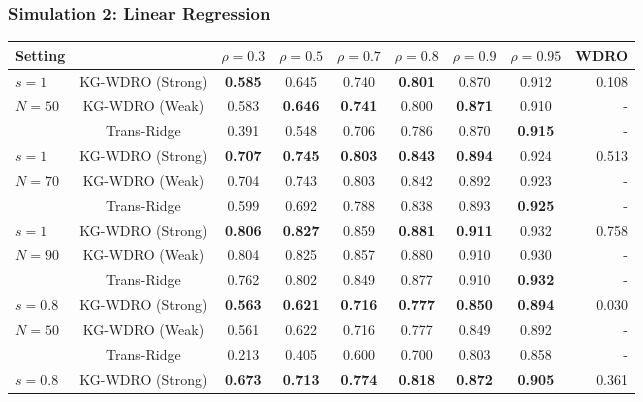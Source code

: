 \documentclass[12pt]{article}
\begin{document}
\subsubsection{Simulation 2: Linear Regression}
\begin{table}[H]
\begin{center}
\setlength{\tabcolsep}{4pt} %
\renewcommand{\arraystretch}{1.1} %
\begin{small}
\begin{sc}
\begin{tabular}{l|c|cccccc|r}
\toprule
Setting & & $\rho = 0.3$ & $\rho = 0.5$ & $\rho = 0.7$ & $\rho = 0.8$ & $\rho = 0.9$ & $\rho = 0.95$ & WDRO\\
\midrule
$s = 1$ & KG-WDRO (Strong) & \textbf{0.585} & 0.645 & 0.740 & \textbf{0.801} & 0.870 & 0.912 & 0.108\\
$N=50$  & KG-WDRO (Weak) & 0.583 & \textbf{0.646} & \textbf{0.741} & 0.800 & \textbf{0.871} & 0.910 & -\\
        & Trans-Ridge & 0.391 & 0.548 & 0.706 & 0.786 & 0.870 & \textbf{0.915} & -\\
\midrule
$s = 1$ & KG-WDRO (Strong) & \textbf{0.707} & \textbf{0.745} & \textbf{0.803} & \textbf{0.843} & \textbf{0.894} & {0.924} & 0.513\\
$N=70$  & KG-WDRO (Weak) & 0.704 & 0.743 & 0.803 & 0.842 & 0.892 & 0.923 & -\\
        & Trans-Ridge & 0.599 & 0.692 & 0.788 & 0.838 & 0.893 & \textbf{0.925} & -\\
\midrule
$s = 1$ & KG-WDRO (Strong) & \textbf{0.806} & \textbf{0.827} & {0.859} & \textbf{0.881} & \textbf{0.911} & {0.932} & 0.758\\
$N=90$    & KG-WDRO (Weak) & 0.804 & 0.825 & 0.857 & 0.880 & 0.910 & 0.930 & -\\
          & Trans-Ridge & 0.762 & 0.802 & 0.849 & 0.877 & {0.910} & \textbf{0.932} & -\\
\midrule
$s = 0.8$ & KG-WDRO (Strong) & \textbf{0.563} & \textbf{0.621} & \textbf{0.716} & \textbf{0.777} & \textbf{0.850} & \textbf{0.894} & 0.030\\
$N=50$    & KG-WDRO (Weak) & 0.561 & 0.622 & 0.716 & 0.777 & 0.849 & 0.892 & -\\
          & Trans-Ridge & 0.213 & 0.405 & 0.600 & 0.700 & 0.803 & 0.858 & -\\
\midrule
$s = 0.8$ & KG-WDRO (Strong) & \textbf{0.673} & \textbf{0.713} & \textbf{0.774} & \textbf{0.818} & \textbf{0.872} & \textbf{0.905} & 0.361\\

\end{tabular}
\end{sc}
\end{small}
\end{center}
\end{table}
\end{document}
